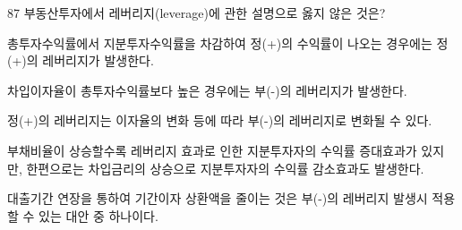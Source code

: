 \begin{question}{87}
부동산투자에서 레버리지(leverage)에 관한 설명으로 옳지 않은 것은?
\begin{choices}
  \item 총투자수익률에서 지분투자수익률을 차감하여 정(+)의 수익률이 나오는 경우에는 정(+)의 레버리지가 발생한다.
  \item 차입이자율이 총투자수익률보다 높은 경우에는 부(-)의 레버리지가 발생한다.
  \item 정(+)의 레버리지는 이자율의 변화 등에 따라 부(-)의 레버리지로 변화될 수 있다.
  \item 부채비율이 상승할수록 레버리지 효과로 인한 지분투자자의 수익률 증대효과가 있지만, 한편으로는 차입금리의 상승으로 지분투자자의 수익률 감소효과도 발생한다.
  \item 대출기간 연장을 통하여 기간이자 상환액을 줄이는 것은 부(-)의 레버리지 발생시 적용할 수 있는 대안 중 하나이다.
\end{choices}
\end{question}
